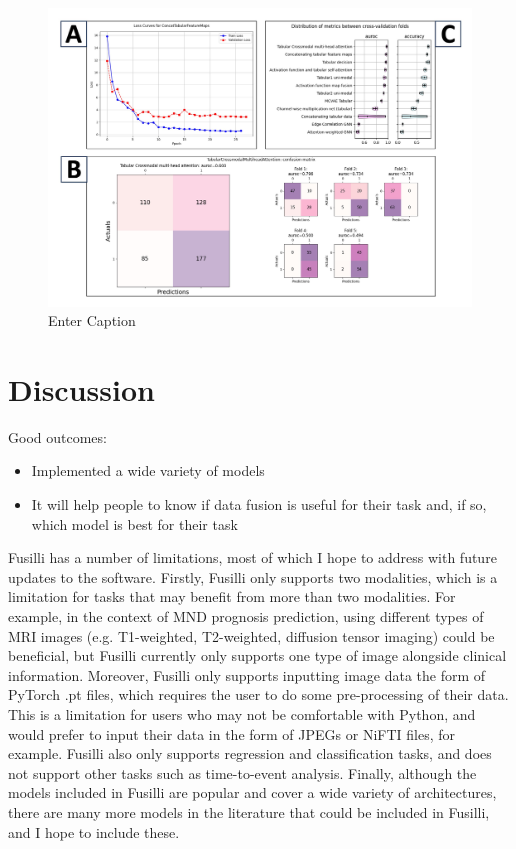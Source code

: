 \begin{figure}
    \centering
    \includegraphics[width=1\linewidth]{figures/fusilli_outputs.jpg}
    \caption{Enter Caption}
    \label{fig:fusillioutputs}
\end{figure}


\section{Discussion}

Good outcomes:
\begin{itemize}
    \item Implemented a wide variety of models
    \item It will help people to know if data fusion is useful for their task and, if so, which model is best for their task
\end{itemize}

Fusilli has a number of limitations, most of which I hope to address with future updates to the software.
Firstly, Fusilli only supports two modalities, which is a limitation for tasks that may benefit from more than two modalities.
For example, in the context of MND prognosis prediction, using different types of MRI images (e.g. T1-weighted, T2-weighted, diffusion tensor imaging) could be beneficial, but Fusilli currently only supports one type of image alongside clinical information.
Moreover, Fusilli only supports inputting image data the form of PyTorch .pt files, which requires the user to do some pre-processing of their data.
This is a limitation for users who may not be comfortable with Python, and would prefer to input their data in the form of JPEGs or NiFTI files, for example.
Fusilli also only supports regression and classification tasks, and does not support other tasks such as time-to-event analysis.
Finally, although the models included in Fusilli are popular and cover a wide variety of architectures, there are many more models in the literature that could be included in Fusilli, and I hope to include these.

